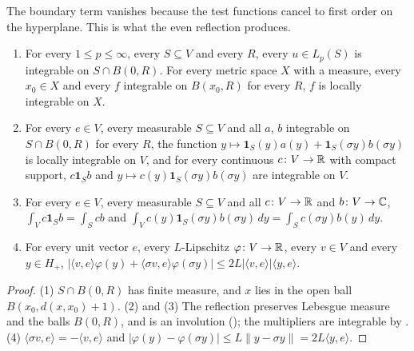 The boundary term vanishes because the test functions cancel to first order on the hyperplane.
This is what the even reflection produces.

\begin{lemma}
\label{lem:reflected-integrals}
\leanok
{}
\begin{enumerate}
  \item For every $1 \leq p \leq \infty$, every $S \subseteq V$ and every $R$, every
    $u \in L_p(S)$ is integrable on $S \cap B(0, R)$. For every metric space $X$ with a measure,
    every $x_0 \in X$ and every $f$ integrable on $B(x_0, R)$ for every $R$, $f$ is locally
    integrable on $X$.
  \item For every $e \in V$, every measurable $S \subseteq V$ and all $a$, $b$ integrable on
    $S \cap B(0, R)$ for every $R$, the function
    $y \mapsto \mathbf 1_S(y) a(y) + \mathbf 1_S(\sigma y) b(\sigma y)$ is locally integrable on
    $V$, and for every continuous $c \colon V \to \mathbb{R}$ with compact support, $c \mathbf 1_S b$ and
    $y \mapsto c(y) \mathbf 1_S(\sigma y) b(\sigma y)$ are integrable on $V$.
  \item For every $e \in V$, every measurable $S \subseteq V$ and all $c \colon V \to \mathbb{R}$ and
    $b \colon V \to \mathbb{C}$, $\int_V c \mathbf 1_S b = \int_S c b$ and
    $\int_V c(y) \mathbf 1_S(\sigma y) b(\sigma y) \, dy = \int_S c(\sigma y) b(y) \, dy$.
  \item For every unit vector $e$, every $L$-Lipschitz $\varphi \colon V \to \mathbb{R}$, every $v \in V$
    and every $y \in H_+$,
    $|\langle v, e \rangle \varphi(y) + \langle \sigma v, e \rangle \varphi(\sigma y)| \leq
    2 L |\langle v, e \rangle| \langle y, e \rangle$.
\end{enumerate}
\end{lemma}

\begin{proof}
\leanok
(1) $S \cap B(0, R)$ has finite measure, and $x$ lies in the open ball
$B(x_0, d(x, x_0) + 1)$.
(2) and (3) The reflection preserves Lebesgue measure and the balls $B(0, R)$, and is an
involution (); the multipliers are integrable by
. (4) $\langle \sigma v, e \rangle = -\langle v, e \rangle$
and $|\varphi(y) - \varphi(\sigma y)| \leq L \|y - \sigma y\| = 2 L \langle y, e \rangle$.
\end{proof}

